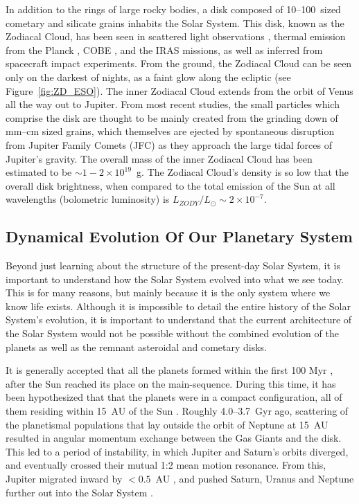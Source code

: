     
    In addition to the rings of large rocky bodies, a disk composed of 10--100\micron\ sized cometary and silicate grains inhabits the Solar System. This disk, known as the Zodiacal Cloud, has been seen in scattered light observations \citep{Hahn2002}, thermal emission from the Planck \citep{Maris2006}, COBE \citep{Kelsall1998}, and the IRAS \citep{Sykes1990} missions, as well as inferred from spacecraft impact experiments. From the ground, the Zodiacal Cloud can be seen only on the darkest of nights, as a faint glow along the ecliptic (see Figure~\ref{fig:ZD_ESO}). The inner Zodiacal Cloud extends from the orbit of Venus all the way out to Jupiter. From most recent studies, the small particles which comprise the disk are thought to be mainly created from the grinding down of mm--cm sized grains, which themselves are ejected by spontaneous disruption from Jupiter Family Comets (JFC) as they approach the large tidal forces of Jupiter's gravity\citep{Nesvorny2010}. The overall mass of the inner Zodiacal Cloud has been estimated to be $\sim1-2\times10^{19}$~g. The Zodiacal Cloud's density is so low that the overall disk brightness, when compared to the total emission of the Sun at all wavelengths (bolometric luminosity) is $L_{ZODY}/L_\odot \sim 2\times10^{-7}$. 


    
    \subsection{Dynamical Evolution Of Our Planetary System}\label{sec:solar_system}
    
    Beyond just learning about the structure of the present-day Solar System, it is important to understand how the Solar System evolved into what we see today. This is for many reasons, but mainly because it is the only system where we know life exists. Although it is impossible to detail the entire history of the Solar System's evolution, it is important to understand that the current architecture of the Solar System would not be possible without the combined evolution of the planets as well as the remnant asteroidal and cometary disks. 
    
    It is generally accepted that all the planets formed within the first 100 Myr \citep[upper limit based on the final accretion to create Earth,][]{Allegre2008}, after the Sun reached its place on the main-sequence. During this time, it has been hypothesized that that the planets were in a compact configuration, all of them residing within 15~AU of the Sun \citep{Batygin2010}. Roughly 4.0--3.7~Gyr ago, scattering of the planetismal populations that lay outside the orbit of Neptune at 15~AU resulted in angular momentum exchange between the Gas Giants and the disk. This led to a period of instability, in which Jupiter and Saturn's orbits diverged, and eventually crossed their mutual 1:2 mean motion resonance. From this, Jupiter migrated inward by $<0.5$~AU \citep{Morbidelli2010}, and pushed Saturn, Uranus and Neptune further out into the Solar System \citep{Tsiganis2005}. 
    
